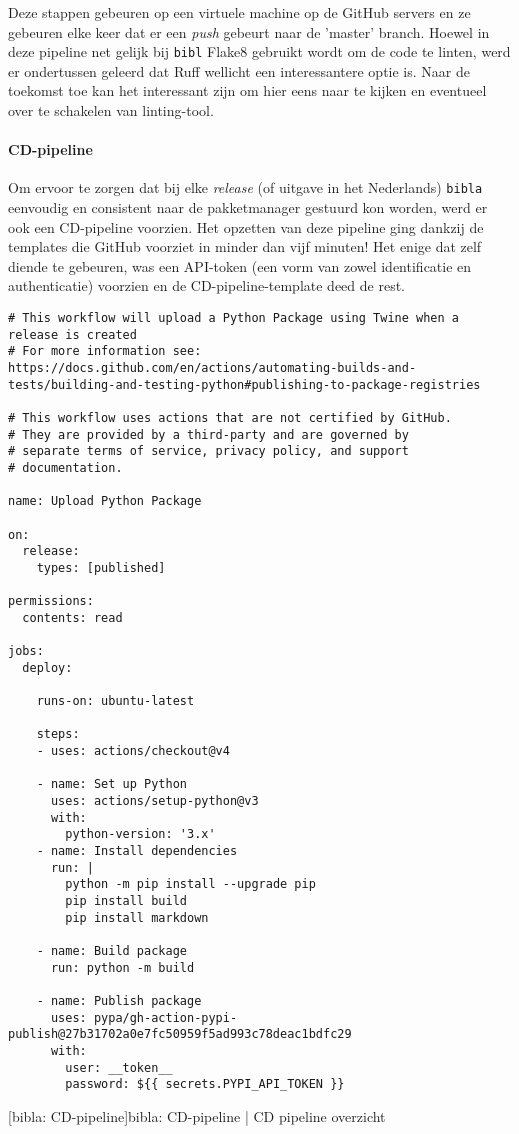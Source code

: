 Deze stappen gebeuren op een virtuele machine op de GitHub servers en ze gebeuren elke keer dat er een \emph{push} gebeurt naar de 'master' branch.
Hoewel in deze pipeline net gelijk bij \texttt{bibl} Flake8 gebruikt wordt om de code te linten, werd er ondertussen geleerd dat Ruff wellicht een interessantere optie is. Naar de toekomst toe kan het interessant zijn om hier eens naar te kijken en eventueel over te schakelen van linting-tool.


\paragraph{CD-pipeline}
Om ervoor te zorgen dat bij elke \emph{release} (of uitgave in het Nederlands) \texttt{bibla} eenvoudig en consistent naar de pakketmanager gestuurd kon worden, werd er ook een CD-pipeline voorzien. Het opzetten van deze pipeline ging dankzij de templates die GitHub voorziet in minder dan vijf minuten! Het enige dat zelf diende te gebeuren, was een API-token (een vorm van zowel identificatie en authenticatie) voorzien en de CD-pipeline-template deed de rest.

\begin{verbatim}
# This workflow will upload a Python Package using Twine when a release is created
# For more information see: https://docs.github.com/en/actions/automating-builds-and-tests/building-and-testing-python#publishing-to-package-registries

# This workflow uses actions that are not certified by GitHub.
# They are provided by a third-party and are governed by
# separate terms of service, privacy policy, and support
# documentation.

name: Upload Python Package

on:
  release:
    types: [published]

permissions:
  contents: read

jobs:
  deploy:

    runs-on: ubuntu-latest

    steps:
    - uses: actions/checkout@v4

    - name: Set up Python
      uses: actions/setup-python@v3
      with:
        python-version: '3.x'
    - name: Install dependencies
      run: |
        python -m pip install --upgrade pip
        pip install build
        pip install markdown

    - name: Build package
      run: python -m build

    - name: Publish package
      uses: pypa/gh-action-pypi-publish@27b31702a0e7fc50959f5ad993c78deac1bdfc29
      with:
        user: __token__
        password: ${{ secrets.PYPI_API_TOKEN }}

\end{verbatim}
[bibla: \acrshort{CD}-pipeline]{bibla: \acrshort{CD}-pipeline | \acrfull{CD} pipeline overzicht \label{lst:bibla_CD}}